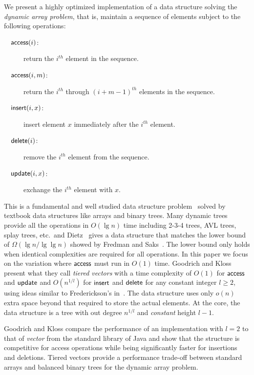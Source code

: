 We present a highly optimized implementation
of a data structure solving the \textit{dynamic array problem},
that is, maintain a sequence of elements subject to the following operations:

\begin{description}
    \item[$\quad\mathsf{access}(i)$:] return the $i^{th}$ element
        in the sequence.
	\item[$\quad\mathsf{access}(i, m)$:] return the $i^{th}$ through $(i+m-1)^{th}$
            elements in the sequence.
	\item[$\quad\mathsf{insert}(i, x)$:] insert element $x$ 
            immediately after the $i^{th}$ element.
	\item[$\quad\mathsf{delete}(i)$:] remove the
            $i^{th}$ element from the sequence.
	\item[$\quad\mathsf{update}(i, x)$:] exchange the $i^{th}$ element
            with $x$.
\end{description}
\noindent
This is a fundamental and well studied
data structure problem~\cite{Dietz:1989:OAL:645928.672529,
    Fredman:1989:CPC:73007.73040, Katajainen2001,
    Raman2001, Frederickson:1983:IDS:322358.322364,
    Brodnik:1999:RAO:645932.673194,
    Goodrich1999,Katajainen2016}
solved by textbook data structures like arrays and binary trees.
Many dynamic trees provide all the operations in
$O(\lg n)$ time including 2-3-4 trees, AVL trees, splay trees, etc.\
and Dietz~\cite{Dietz:1989:OAL:645928.672529} gives
a data structure that matches the lower bound
of $\Omega(\lg n/ \lg \lg n)$  showed by
Fredman and Saks~\cite{Fredman:1989:CPC:73007.73040}.
The lower bound only holds when identical complexities are required for all operations.
In this paper we focus on the variation where $\mathsf{access}$ must run in $O(1)$ time.
Goodrich and Kloss present what they call \textit{tiered vectors}
\cite{Goodrich1999} with a time complexity of $O(1)$ 
for $\mathsf{access}$ and $\mathsf{update}$ and $O(n^{1/l})$ for $\mathsf{insert}$ and $\mathsf{delete}$
for any constant integer $l \geq 2$, using ideas similar 
to Frederickson's in~\cite{Frederickson:1983:IDS:322358.322364}.
The data structure
uses only $o(n)$ extra space beyond that required to store the actual elements. 
At the core, the data structure is a tree with out degree
$n^{1/l}$ and \emph{constant} height $l - 1$.

Goodrich and Kloss compare the performance
of an implementation with $l = 2$ to that of
\textit{vector} from the standard library of Java
and show that the structure is competitive for
access operations while being significantly faster
for insertions and deletions.
Tiered vectors provide 
a performance trade-off between standard arrays and balanced binary trees
for the dynamic array problem.

